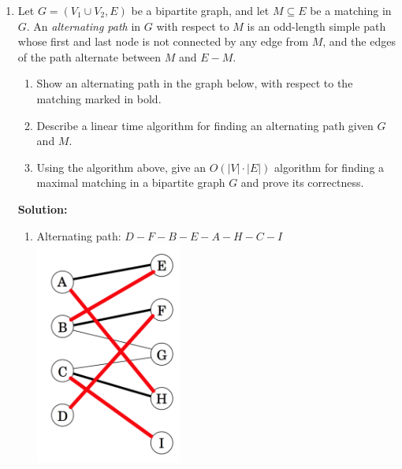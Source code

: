 \documentclass[11pt]{article}
\begin{document}
\begin{enumerate}
\item
Let $G=(V_1\cup V_2, E)$ be a bipartite graph, and let $M\subseteq E$ be a
matching in $G$. An {\em alternating path} in $G$ with respect to $M$
is an odd-length simple path whose first and last node is not connected
by any edge from $M$, and the edges of the path alternate between $M$ and $E-M$.
\begin{enumerate}
\item Show an alternating path in the graph below, with respect to the
  matching marked in bold.
\begin{center}
 \end{center}
\item Describe a linear time algorithm for finding an alternating path
  given $G$ and $M$.
\item Using the algorithm above, give an $O(|V|\cdot |E|)$ algorithm
  for finding a maximal matching in a bipartite graph $G$ and prove
  its correctness. 
\end{enumerate}
\textbf{Solution:}\\
\begin{enumerate}
\item 
Alternating path: $D-F-B-E-A-H-C-I$\\
\includegraphics[width=0.4\textwidth]{alternatepath}


\end{enumerate}
\end{enumerate}
\end{document}
